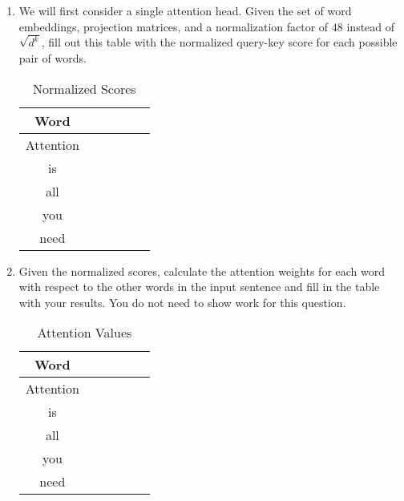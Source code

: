 \documentclass[12pt, letterpaper]{article}
\begin{document}
\begin{enumerate}
 \item We will first consider a single attention head. Given the set of word embeddings, projection matrices, and a normalization factor of $48$ instead of $\sqrt{d^k}$, fill out this table with the normalized query-key score for each possible pair of words.


\begin{table}[H]
\begin{center}
\begin{tabular}{ |c|c|c|c|c|c| } 
\hline
 Word  &  \multicolumn{1}{c}{} \hspace{0.5cm}  & \multicolumn{1}{c}{} \hspace{0.5cm}  & \multicolumn{1}{c}{} \hspace{0.5cm}  &  \multicolumn{1}{c}{}\hspace{0.5cm}  &  \hspace{0.5cm}  \\
\hline
Attention &    &   &   &   &  \\
\hline
is        &    &   &   &   &  \\
\hline
all       &    &   &   &   &  \\
\hline
you       &    &   &   &   &  \\
\hline
need      &    &   &   &   &  \\
\hline
\end{tabular}
\caption{Normalized Scores}
\end{center}
\end{table}

\item Given the normalized scores, calculate the attention weights for each word with respect to the other words in the input sentence and fill in the table with your results. You do not need to show work for this question.

\begin{table}[H]
\begin{center}
\begin{tabular}{ |c|c|c|c|c|c| } 
\hline
 Word  &  \multicolumn{1}{c}{} \hspace{0.5cm}  & \multicolumn{1}{c}{} \hspace{0.5cm}  & \multicolumn{1}{c}{} \hspace{0.5cm}  &  \multicolumn{1}{c}{}\hspace{0.5cm}  &  \hspace{0.5cm}  \\
\hline
Attention &    &   &   &   &  \\
\hline
is        &    &   &   &   &  \\
\hline
all       &    &   &   &   &  \\
\hline
you       &    &   &   &   &  \\
\hline
need      &    &   &   &   &  \\
\hline
\end{tabular}
\caption{Attention Values}
\end{center}
\end{table}


\end{enumerate}
\end{document}
